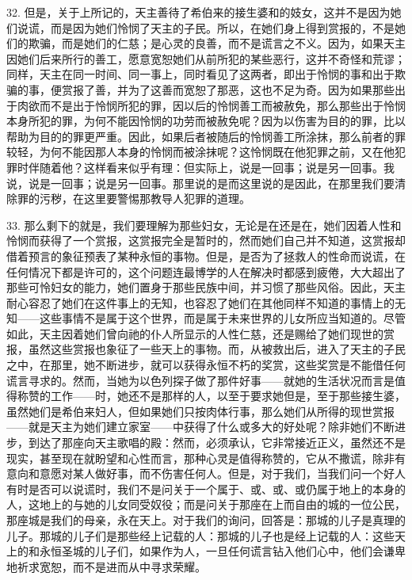 32. 但是，关于上所记的，天主善待了希伯来的接生婆和的妓女，这并不是因为她们说谎，而是因为她们怜悯了天主的子民。所以，在她们身上得到赏报的，不是她们的欺骗，而是她们的仁慈；是心灵的良善，而不是谎言之不义。因为，如果天主因她们后来所行的善工，愿意宽恕她们从前所犯的某些恶行，这并不奇怪和荒谬；同样，天主在同一时间、同一事上，同时看见了这两者，即出于怜悯的事和出于欺骗的事，便赏报了善，并为了这善而宽恕了那恶，这也不足为奇。因为如果那些出于肉欲而不是出于怜悯所犯的罪，因以后的怜悯善工而被赦免，那么那些出于怜悯本身所犯的罪，为何不能因怜悯的功劳而被赦免呢？因为以伤害为目的的罪，比以帮助为目的的罪更严重。因此，如果后者被随后的怜悯善工所涂抹，那么前者的罪较轻，为何不能因那人本身的怜悯而被涂抹呢？这怜悯既在他犯罪之前，又在他犯罪时伴随着他？这样看来似乎有理：但实际上，说是一回事；说是另一回事。我说，说是一回事；说是另一回事。那里说的是而这里说的是因此，在那里我们要清除罪的污秽，在这里要警惕那教导人犯罪的道理。\par

33. 那么剩下的就是，我们要理解为那些妇女，无论是在还是在，她们因着人性和怜悯而获得了一个赏报，这赏报完全是暂时的，然而她们自己并不知道，这赏报却借着预言的象征预表了某种永恒的事物。但是，是否为了拯救人的性命而说谎，在任何情况下都是许可的，这个问题连最博学的人在解决时都感到疲倦，大大超出了那些可怜妇女的能力，她们置身于那些民族中间，并习惯了那些风俗。因此，天主耐心容忍了她们在这件事上的无知，也容忍了她们在其他同样不知道的事情上的无知——这些事情不是属于这个世界，而是属于未来世界的儿女所应当知道的。尽管如此，天主因着她们曾向祂的仆人所显示的人性仁慈，还是赐给了她们现世的赏报，虽然这些赏报也象征了一些天上的事物。而，从被救出后，进入了天主的子民之中，在那里，她不断进步，就可以获得永恒不朽的奖赏，这些奖赏是不能借任何谎言寻求的。然而，当她为以色列探子做了那件好事——就她的生活状况而言是值得称赞的工作——时，她还不是那样的人，以至于要求她但是，至于那些接生婆，虽然她们是希伯来妇人，但如果她们只按肉体行事，那么她们从所得的现世赏报——就是天主为她们建立家室——中获得了什么或多大的好处呢？除非她们不断进步，到达了那座向天主歌唱的殿：然而，必须承认，它非常接近正义，虽然还不是现实，甚至现在就盼望和心性而言，那种心灵是值得称赞的，它从不撒谎，除非有意向和意愿对某人做好事，而不伤害任何人。但是，对于我们，当我们问一个好人有时是否可以说谎时，我们不是问关于一个属于、或、或、或仍属于地上的本身的人，这地上的与她的儿女同受奴役；而是问关于那座在上而自由的城的一位公民，那座城是我们的母亲，永在天上。对于我们的询问，回答是：那城的儿子是真理的儿子。那城的儿子们是那些经上记载的人：那城的儿子也是经上记载的人：这些天上的和永恒圣城的儿子们，如果作为人，一旦任何谎言钻入他们心中，他们会谦卑地祈求宽恕，而不是进而从中寻求荣耀。\par

